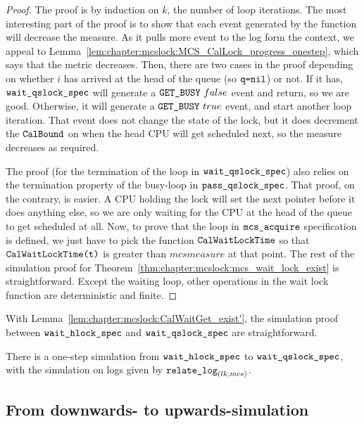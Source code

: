 \begin{proof}
The proof is by induction on $k$, the number of loop iterations. The
most interesting part of the proof is to show that each event
generated by the function will decrease the measure.
As it pulls more event to the log form the context, we appeal to
Lemma~\ref{lem:chapter:mcslock:MCS_CalLock_progress_onestep}, which says that the metric decreases. 
Then, there are two cases in the proof depending on whether $i$ has
arrived at the head of the queue (so ${\mathrm{\texttt{q=}}}{\mathrm{\texttt{nil}}}$) or not. If it has,
${\mathrm{\texttt{wait\_qslock\_spec}}}$ will generate a ${\mathrm{\texttt{GET\_BUSY}}}~{false}$
event and return, so we are good. 
Otherwise, it will generate a ${\mathrm{\texttt{GET\_BUSY}}}~{true}$ event, and
start another loop iteration. That event does not change the state of
the lock, but it does decrement the ${\mathrm{\texttt{CalBound}}}$ on when the head CPU
will get scheduled next, so the measure decreases as required.

The proof (for the termination of the loop in ${\mathrm{\texttt{wait\_qslock\_spec}}}$) also relies on the termination property of the busy-loop in ${\mathrm{\texttt{pass\_qslock\_spec}}}$.
That proof, on the contrary, is easier. A CPU holding the lock will set
the next pointer before it does anything else, so we are only waiting
for the CPU at the head of the queue to get scheduled at all.
Now, to prove that the loop in ${\mathrm{\texttt{mcs\_acquire}}}$ specification
is defined, we just have to pick the function ${\mathrm{\texttt{CalWaitLockTime}}}$
so that ${\mathrm{\texttt{CalWaitLockTime}}}{\mathrm{\texttt{(t)}}}$ is greater than $mcsmeasure$ at that
point. The rest of the simulation proof for Theorem~\ref{thm:chapter:mcslock:mcs_wait_lock_exist} is straightforward.
Except the waiting loop, other operations in the wait lock function are deterministic and finite. 
\end{proof}

With Lemma~\ref{lem:chapter:mcslock:CalWaitGet_exist'}, 
the simulation proof between ${\mathrm{\texttt{wait\_hlock\_spec}}}$ and ${\mathrm{\texttt{wait\_qslock\_spec}}}$ are straightforward.
\begin{theorem}
There is a one-step simulation from ${\mathrm{\texttt{wait\_hlock\_spec}}}$ to
${\mathrm{\texttt{wait\_qslock\_spec}}}$, with the simulation on logs given by ${\mathrm{\texttt{relate\_log}}}_{(lk, mcs)}$.
\end{theorem}


\subsection{From downwards- to upwards-simulation}
\label{chapter:mcslock:sec:downwards-to-upwards}


